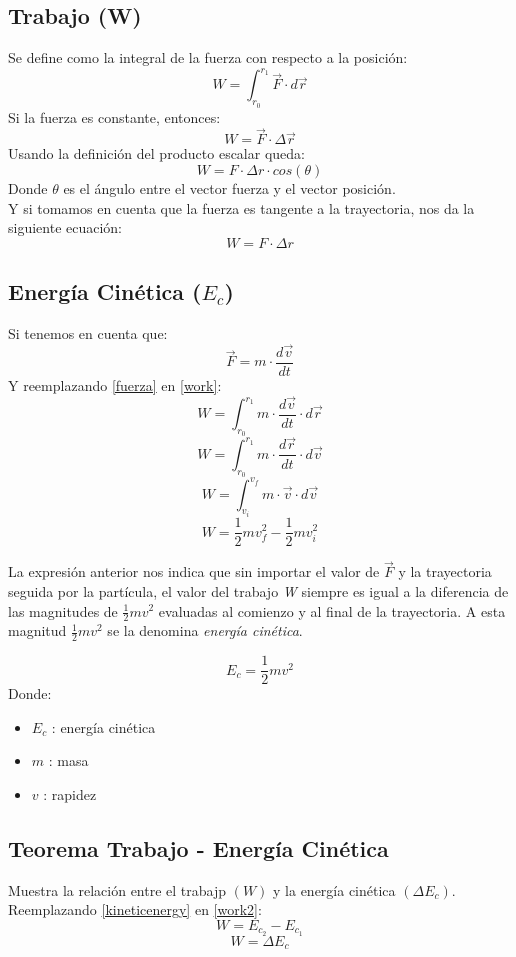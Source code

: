 \documentclass[../main.tex]{subfiles}
\begin{document}
\subsection{Trabajo (W)}
Se define como la integral de la fuerza con respecto a la posición:
\begin{equation} \label{work}
    W = \int_{r_0}^{r_1} \vec{F} \cdot d \vec{r} 
\end{equation}
Si la fuerza es constante, entonces:
\[ W = \vec{F} \cdot \Delta \vec{r} \]
Usando la definición del producto escalar queda:
\[ W = F \cdot \Delta r \cdot cos(\theta)\]
Donde $\theta$ es el ángulo entre el vector fuerza y el vector posición.\\
Y si tomamos en cuenta que la fuerza es tangente a la trayectoria,
nos da la siguiente ecuación:
\begin{equation} \label{work1}
    W = F \cdot \Delta r 
\end{equation}

\subsection{Energía Cinética ($E_c$)}
Si tenemos en cuenta que:
\begin{equation} \label{fuerza}
    \vec{F} = m \cdot \frac{d \vec{v}}{dt}
\end{equation}
Y reemplazando \ref{fuerza} en \ref{work}:
\[ W = \int_{r_0}^{r_1} m \cdot \frac{d \vec{v}}{dt} \cdot d \vec{r} \]
\[ W = \int_{r_0}^{r_1} m \cdot \frac{d \vec{r}}{dt} \cdot d \vec{v} \]
\[ W = \int_{v_i}^{v_f} m \cdot \vec{v} \cdot d \vec{v} \]
\begin{equation} \label{work2}
    W = \frac{1}{2}mv_f^2 - \frac{1}{2}mv_i^2 
\end{equation}

La expresión anterior nos indica que sin importar el valor de \(\vec{F}\) y la 
trayectoria seguida por la partícula, el valor del trabajo \textit{W}
siempre es igual a la diferencia de las magnitudes de 
\(\frac{1}{2}mv^2\) evaluadas al comienzo y al final de la
 trayectoria. A esta magnitud \(\frac{1}{2}mv^2 \) se la denomina
\textit{energía cinética}.

\begin{equation} \label{kineticenergy}
    E_c = \frac{1}{2}mv^2 
\end{equation}
Donde:
\begin{itemize}
    \item $E_c$ : energía cinética
    \item $m$ : masa
    \item $v$ : rapidez
\end{itemize}

\subsection{Teorema Trabajo - Energía Cinética}
Muestra la relación entre el trabajp $(W)$ y la energía cinética $(\Delta E_c)$.\\
Reemplazando \ref{kineticenergy} en \ref{work2}:
\[W = E_{c_2} - E_{c_1} \]
\begin{equation} \label{work3}
    W = \Delta E_c
\end{equation}
\end{document}
